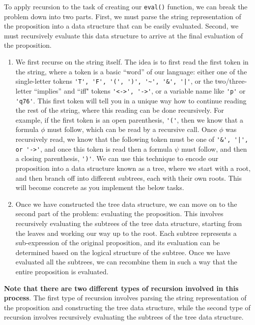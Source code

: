 \documentclass{article}
\begin{document}
    \vspace{3mm}
    To apply recursion to the task of creating our \lstinline+eval()+ function, we can break the problem down into two parts. First, we must parse the string representation of the proposition into a data structure that can be easily evaluated. Second, we must recursively evaluate this data structure to arrive at the final evaluation of the proposition.

    \begin{enumerate}[label = \arabic*.]
        \item We first recurse on the string itself. The idea is to first read the first token in the string, where a token is a basic “word” of our language: either one of the single-letter tokens \lstinline{'T', 'F', '(', ')', '~', '&', '|'}, or the two/three-letter “implies” and ``iff" tokens \lstinline{'<->', '->'}, or a variable name like \lstinline{'p'} or \lstinline{'q76'}. This first token will tell you in a unique way how to continue reading the rest of the string, where this reading can be done recursively. For example, if the first token is an open parenthesis, \lstinline{'('}, then we know that a formula $\phi$ must follow, which can be read by a recursive call. Once $\phi$ was recursively read, we know that the following token must be one of \lstinline{'&', '|', or '->'}, and once this token is read then a formula $\psi$ must follow, and then a closing parenthesis, \lstinline{')'}. We can use this technique to encode our proposition into a data structure known as a tree, where we start with a root, and then branch off into different subtrees, each with their own roots. This will become concrete as you implement the below tasks.
        \item 
        Once we have constructed the tree data structure, we can move on to the second part of the problem: evaluating the proposition. This involves recursively evaluating the subtrees of the tree data structure, starting from the leaves and working our way up to the root. Each subtree represents a sub-expression of the original proposition, and its evaluation can be determined based on the logical structure of the subtree. Once we have evaluated all the subtrees, we can recombine them in such a way that the entire proposition is evaluated.
    \end{enumerate}
    \textbf{Note that there are two different types of recursion involved in this process}. The first type of recursion involves parsing the string representation of the proposition and constructing the tree data structure, while the second type of recursion involves recursively evaluating the subtrees of the tree data structure.
    
\end{document}

